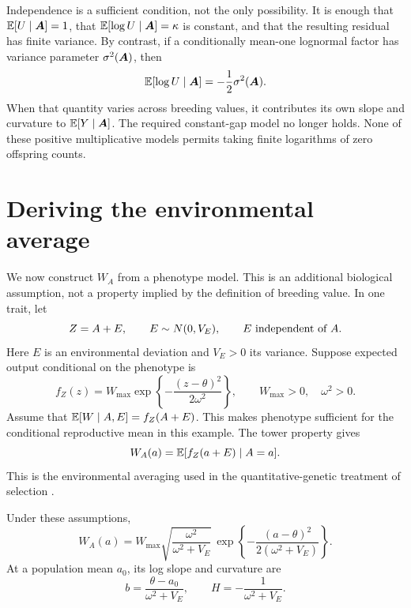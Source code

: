 Independence is a sufficient condition, not the only possibility. It is enough
that \(\mathbb E[U\mid\boldsymbol{A}]=1\), that
\(\mathbb E[\log U\mid\boldsymbol{A}]=\kappa\) is constant, and that the resulting residual
has finite variance. By contrast, if a conditionally mean-one lognormal factor
has variance parameter \(\sigma^2(\boldsymbol{A})\), then
\[
 \mathbb E[\log U\mid\boldsymbol{A}]=-\frac12\sigma^2(\boldsymbol{A}).
\]
When that quantity varies across breeding values, it contributes its own slope
and curvature to \(\mathbb E[Y\mid\boldsymbol{A}]\). The required constant-gap model no longer
holds. None of these positive multiplicative models permits taking finite
logarithms of zero offspring counts.

\section{Deriving the environmental average}

We now construct \(W_A\) from a phenotype model. This is an additional
biological assumption, not a property implied by the definition of breeding
value. In one trait, let
\[
 Z=A+E,\qquad E\sim N(0,V_E),\qquad E\ \hbox{independent of }A.
\]
Here \(E\) is an environmental deviation and \(V_E>0\) its variance. Suppose
expected output conditional on the phenotype is
\begin{equation}
 f_Z(z)=W_{\max}
 \exp\!\left\{-\frac{(z-\theta)^2}{2\omega^2}\right\},
 \qquad W_{\max}>0,\quad\omega^2>0.
 \label{conditioning:phenotype_fitness}
\end{equation}
Assume that \(\mathbb E[W\mid A,E]=f_Z(A+E)\). This makes phenotype sufficient for
the conditional reproductive mean in this example. The tower property gives
\[
 W_A(a)=\mathbb E[f_Z(a+E)\mid A=a].
\]
This is the environmental averaging used in the quantitative-genetic treatment
of selection \citep{Lande1979}.

\begin{proposition}
\label{conditioning:environmental_average}
Under these assumptions,
\begin{equation}
 W_A(a)=W_{\max}
 \sqrt{\frac{\omega^2}{\omega^2+V_E}}\,
 \exp\!\left\{-\frac{(a-\theta)^2}{2(\omega^2+V_E)}\right\}.
 \label{conditioning:environment_formula}
\end{equation}
At a population mean \(a_0\), its log slope and curvature are
\begin{equation}
 b=\frac{\theta-a_0}{\omega^2+V_E},
 \qquad H=-\frac{1}{\omega^2+V_E}.
 \label{conditioning:environment_derivatives}
\end{equation}
\end{proposition}

